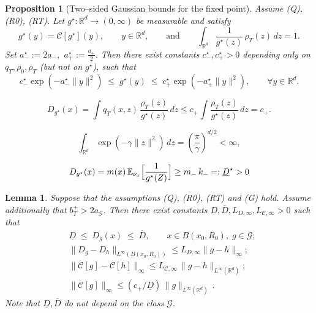 \documentclass[10pt,a4paper]{amsart}
\newtheorem{proposition}{Proposition}
\newtheorem{lemma}{Lemma}
\newcommand{\R}{\mathbb{R}}
\def\aGmin{a_{\mathcal{G}}}
\def\aStarmax{a_{+}^\star}
\def\aStarmin{a_{-}^\star}
\def\bmax{b_T^{+}}
\def\cStarmax{c_{+}^\star}
\def\cStarmin{c_{-}^\star}
\def\cmax{c_{+}}
\begin{document}
\begin{proposition}[Two--sided Gaussian bounds for the fixed point]
\label{prop:g-two-sided-subgaussian-direct}
Assume \emph{(Q)}, \emph{(R0)}, \emph{(RT)}. Let $g^\star:\mathbb{R}^d\to(0,\infty)$ be measurable and satisfy
\begin{equation}\label{eq:fixed-point-normalization}
  g^\star(y) = \mathcal{C}[g^\star](y), \qquad y\in\mathbb{R}^d,
  \qquad\text{and}\qquad
  \int_{\mathbb{R}^d} \frac{1}{g^\star(z)}\,\rho_T(z)\,dz = 1.
\end{equation}
Set \(\aStarmin := 2a_-,\) \(\aStarmax := \frac{a_+}{2}.\)
Then there exist constants $\cStarmin, \cStarmax>0$ depending only on
$q_T,\rho_0,\rho_T$ (but not on $g^\star$), such that
\begin{equation}\label{eq:g-two-sided-Gaussian}
  \cStarmin \exp(-\aStarmin \|y\|^2)
  \;\le\;
  g^\star(y)
  \;\le\;
  \cStarmax \exp(-\aStarmax \|y\|^2),
  \qquad \forall y\in\mathbb{R}^d.
\end{equation}
\end{proposition}

\begin{equation}
\label{D upper boound}
  D_{g^\star}(x)
  =
  \int q_T(x,z)\,\frac{\rho_T(z)}{g^\star(z)}\,dz
  \le
  \cmax \int \frac{\rho_T(z)}{g^\star(z)}\,dz
  =
  \cmax.
\end{equation}

\begin{equation}
\label{gauss density formula}
\int_{\mathbb{R}^d}
  \exp(-\gamma\|z\|^2)\,dz
  =
  \left(\frac{\pi}{\gamma}\right)^{d/2}
  <\infty,
\end{equation}

\begin{equation}
     \label{Dmin def}
     D_{g^\star}(x)
  =
  m(x)\,\mathbb{E}_{\nu_x}\Bigl[\frac{1}{g^\star(Z)}\Bigr]
  \ge
  m_-\,k_- =: \underline{D}^\star > 0
\end{equation}

\begin{lemma}
\label{lemm: key properties}
Suppose that the assumptions \emph{(Q)}, \emph{(R0)}, \emph{(RT)} and \emph{(G)} hold.  Assume additionally that $\bmax> 2 \aGmin$. Then there exist constants $\underline{D}, \overline{D}, L_{D,\infty}, L_{\mathcal C, \infty} > 0$ such that
\begin{align}
\label{D bounds}
  & \underline{D}
  \;\le\;
  D_g(x)
  \;\le\;
  \overline{D},
  \qquad x\in B(x_0,R_0),\; g\in\mathcal{G}; \\
  \label{D Lip}
  & \|D_g-D_h\|_{L^\infty(B(x_0, R_0))}
  \le
  L_{D,\infty} \|g-h\|_{\infty};  \\
  \label{C lip infty}
  & \|\mathcal C[g]-\mathcal C[h]\|_\infty
  \le
  L_{\mathcal C, \infty}\,\|g-h\|_{L^\infty(\R^d)}; \\
  \label{C infty}
  & \|\mathcal C[g]\|_\infty
  \le
  (\cmax/\underline{D})\,\|g\|_{L^\infty(\R^d)}\, .
\end{align}
Note that $\underline{D}, \overline{D}$ do not depend on the class $\mathcal G$. 
\end{lemma}
\end{document}
